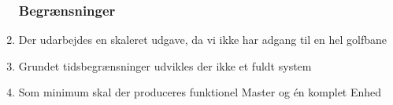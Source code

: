 \begin{enumerate}
\subsubsection*{Begrænsninger}
\item Der udarbejdes en skaleret udgave, da vi ikke har adgang til en hel golfbane
\item Grundet tidsbegrænsninger udvikles der ikke et fuldt system 
\item Som minimum skal der produceres funktionel Master og én komplet Enhed
\end{enumerate}

